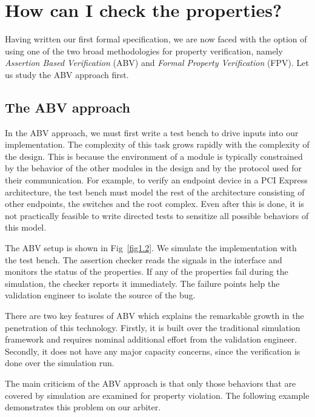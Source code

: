 \section{How can I check the properties?}
Having written our first formal specification, we are now faced with the
option of using one of the two broad methodologies for property verification,
namely {\em Assertion Based Verification} (ABV) and {\em Formal Property
Verification} (FPV). Let us study the ABV approach first.

\subsection{The ABV approach}
In the ABV approach, we must first write a test bench to drive inputs into
our implementation. The complexity of this task grows rapidly with the
complexity of the design. This is because the environment of a module is
typically constrained by the behavior of the other modules in the design
and by the protocol used for their communication. For example, to verify
an endpoint device in a PCI Express architecture, the test bench must model
the rest of the architecture consisting of other endpoints, the switches and
the root complex. Even after this is done, it is not practically feasible
to write directed tests to sensitize all possible behaviors of this model.

The ABV setup is shown in Fig~\ref{fig1.2}. We simulate the implementation
with the test bench. The assertion checker reads the signals in the interface
and monitors the status of the properties. If any of the properties fail
during the simulation, the checker reports it immediately. The failure points
help the validation engineer to isolate the source of the bug.

There are two key features of ABV which explains the remarkable growth
in the penetration of this technology. Firstly, it is built over the
traditional simulation framework and requires nominal additional effort
from the validation engineer. Secondly, it does not have any major capacity
concerns, since the verification is done over the simulation run.

The main criticism of the ABV approach is that only those behaviors that
are covered by simulation are examined for property violation. The following
example demonstrates this problem on our arbiter.

